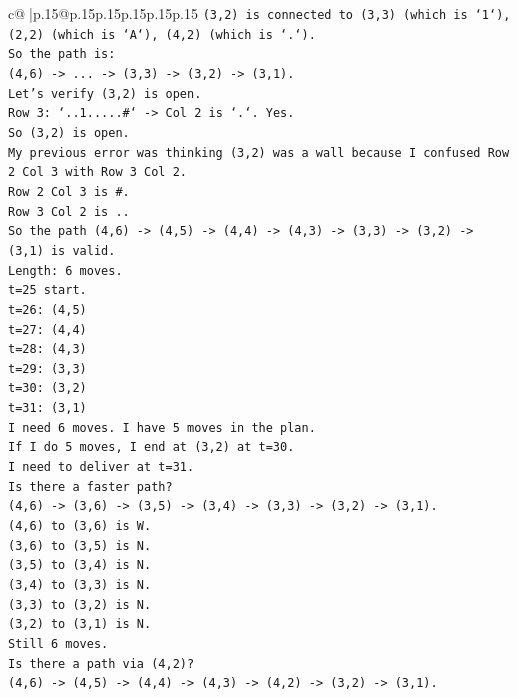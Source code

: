 \documentclass{article}
\begin{document}
{\begin{supertabular}{c@{$\;$}|p{.15\linewidth}@{}p{.15\linewidth}p{.15\linewidth}p{.15\linewidth}p{.15\linewidth}p{.15\linewidth}}
{{{\texttt{(3,2) is connected to (3,3) (which is `1`), (2,2) (which is `A`), (4,2) (which is `.`).} \\
\texttt{So the path is:} \\
\texttt{(4,6) {-}> ... {-}> (3,3) {-}> (3,2) {-}> (3,1).} \\
\texttt{Let's verify (3,2) is open.} \\
\texttt{Row 3: `..1.....\#` {-}> Col 2 is `.`. Yes.} \\
\texttt{So (3,2) is open.} \\
\texttt{My previous error was thinking (3,2) was a wall because I confused Row 2 Col 3 with Row 3 Col 2.} \\
\texttt{Row 2 Col 3 is \#.} \\
\texttt{Row 3 Col 2 is ..} \\
\texttt{So the path (4,6) {-}> (4,5) {-}> (4,4) {-}> (4,3) {-}> (3,3) {-}> (3,2) {-}> (3,1) is valid.} \\
\texttt{Length: 6 moves.} \\
\texttt{t=25 start.} \\
\texttt{t=26: (4,5)} \\
\texttt{t=27: (4,4)} \\
\texttt{t=28: (4,3)} \\
\texttt{t=29: (3,3)} \\
\texttt{t=30: (3,2)} \\
\texttt{t=31: (3,1)} \\
\texttt{I need 6 moves. I have 5 moves in the plan.} \\
\texttt{If I do 5 moves, I end at (3,2) at t=30.} \\
\texttt{I need to deliver at t=31.} \\
\texttt{Is there a faster path?} \\
\texttt{(4,6) {-}> (3,6) {-}> (3,5) {-}> (3,4) {-}> (3,3) {-}> (3,2) {-}> (3,1).} \\
\texttt{(4,6) to (3,6) is W.} \\
\texttt{(3,6) to (3,5) is N.} \\
\texttt{(3,5) to (3,4) is N.} \\
\texttt{(3,4) to (3,3) is N.} \\
\texttt{(3,3) to (3,2) is N.} \\
\texttt{(3,2) to (3,1) is N.} \\
\texttt{Still 6 moves.} \\
\texttt{Is there a path via (4,2)?} \\
\texttt{(4,6) {-}> (4,5) {-}> (4,4) {-}> (4,3) {-}> (4,2) {-}> (3,2) {-}> (3,1).} \\
}}}
\end{supertabular}}
\end{document}

